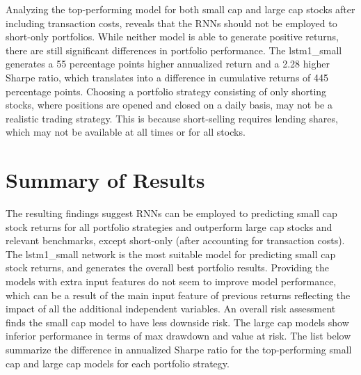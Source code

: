 \indent\newline 
Analyzing the top-performing model for both small cap and large cap stocks after including transaction costs, reveals that the RNNs should not be employed to short-only portfolios. While neither model is able to generate positive returns, there are still significant differences in portfolio performance. The lstm1\_small generates a 55 percentage points higher annualized return and a 2.28 higher Sharpe ratio, which translates into a difference in cumulative returns of 445 percentage points. Choosing a portfolio strategy consisting of only shorting stocks, where positions are opened and closed on a daily basis, may not be a realistic trading strategy. This is because short-selling requires lending shares, which may not be available at all times or for all stocks. 

\section{Summary of Results}
The resulting findings suggest RNNs can be employed to predicting small cap stock returns for all portfolio strategies and outperform large cap stocks and relevant benchmarks, except short-only (after accounting for transaction costs). The lstm1\_small network is the most suitable model for predicting small cap stock returns, and generates the overall best portfolio results. Providing the models with extra input features do not seem to improve model performance, which can be a result of the main input feature of previous returns reflecting the impact of all the additional independent variables. An overall risk assessment finds the small cap model to have less downside risk. The large cap models show inferior performance in terms of max drawdown and value at risk. The list below summarize the difference in annualized Sharpe ratio for the top-performing small cap and large cap models for each portfolio strategy.

\indent\newline
\begin{table}[ht]
\centering
\caption{Best Annualized Sharpe ratio prior to transaction costs - small vs large}
\end{table}

